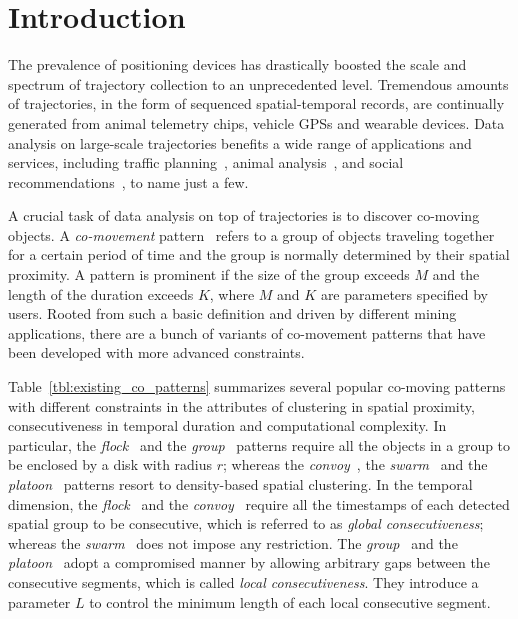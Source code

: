 
\section{Introduction}
The prevalence of positioning devices has drastically boosted 
the scale and spectrum of trajectory collection to an unprecedented level. 
Tremendous amounts of trajectories, in the form of sequenced spatial-temporal 
records, are continually generated from animal telemetry chips, 
vehicle GPSs and wearable devices. Data analysis on large-scale 
trajectories benefits a wide range of applications and services, 
including traffic planning~\cite{zheng2011urban}, animal analysis~\cite{li2010miningperiodic}, and social recommendations~\cite{bao2013survey}, to name just a few.

A crucial task of data analysis on top of trajectories is 
to discover co-moving objects. A \emph{co-movement} pattern~\cite{li2013managing,zheng2015survey} 
refers to a group of objects traveling together for a certain period of time 
and the group is normally determined by their spatial proximity. 
A pattern is prominent if the size of the group exceeds $M$ and the length of the duration exceeds $K$, where $M$ and $K$ are parameters specified by users. Rooted from such a basic definition 
and driven by different mining applications, there are a bunch of variants 
of co-movement patterns that have been developed with more advanced constraints.

Table~\ref{tbl:existing_co_patterns} summarizes several popular co-moving patterns 
with different constraints in the attributes of clustering in spatial proximity,
consecutiveness in temporal duration and computational complexity. 
In particular,  the \emph{flock}~\cite{gudmundsson2006flock} 
and the \emph{group}~\cite{wang2006grouppattern} patterns require 
all the objects in a group to be enclosed by a disk with radius $r$; 
whereas the \emph{convoy}~\cite{jeung2008convoy}, the \emph{swarm}~\cite{li2010swarm} 
and the \emph{platoon}~\cite{li2015platoon} patterns resort to density-based 
spatial clustering. 
In the temporal dimension, the \emph{flock}~\cite{gudmundsson2006flock} 
and the \emph{convoy}~\cite{jeung2008convoy} require all the timestamps 
of each detected spatial group to be consecutive, which is referred to as \emph{global consecutiveness}; 
whereas the \emph{swarm}~\cite{li2010swarm} does not impose any restriction. 
The \emph{group}~\cite{wang2006grouppattern} and the \emph{platoon}~\cite{li2015platoon} adopt a compromised manner by allowing
arbitrary gaps between the consecutive segments, which is called \emph{local consecutiveness}. 
They introduce a parameter $L$ to control the minimum length of each local consecutive segment.

